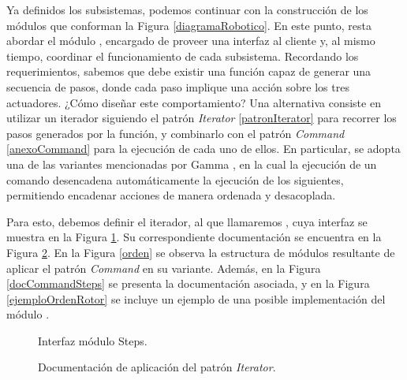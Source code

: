 Ya definidos los subsistemas, podemos continuar con la construcción de los módulos que conforman la Figura \ref{diagramaRobotico}. En este punto, resta abordar el módulo \MainController, encargado de proveer una interfaz al cliente y, al mismo tiempo, coordinar el funcionamiento de cada subsistema. Recordando los requerimientos, sabemos que debe existir una función capaz de generar una secuencia de pasos, donde cada paso implique una acción sobre los tres actuadores. ¿Cómo diseñar este comportamiento? Una alternativa consiste en utilizar un iterador siguiendo el patrón \textit{Iterator} \ref{patronIterator} para recorrer los pasos generados por la función, y combinarlo con el patrón \textit{Command} \ref{anexoCommand} para la ejecución de cada uno de ellos. En particular, se adopta una de las variantes mencionadas por Gamma \cite{Gamma:1995:DPE:186897}, en la cual la ejecución de un comando desencadena automáticamente la ejecución de los siguientes, permitiendo encadenar acciones de manera ordenada y desacoplada.

Para esto, debemos definir el iterador, al que llamaremos \Steps, cuya interfaz se muestra en la Figura \ref{iterator}. Su correspondiente documentación se encuentra en la Figura \ref{docIterator}. En la Figura \ref{orden} se observa la estructura de módulos resultante de aplicar el patrón \textit{Command} en su variante. Además, en la Figura \ref{docCommandSteps} se presenta la documentación asociada, y en la Figura \ref{ejemploOrdenRotor} se incluye un ejemplo de una posible implementación del módulo \OrdenRotor.

\begin{figure}[H]
\caption{Interfaz módulo Steps.}
\label{iterator}
\begin{center}
\end{center}
\end{figure}
\begin{figure}
\caption{Documentación de aplicación del patrón \textit{Iterator}.}
\label{docIterator}
\end{figure}

